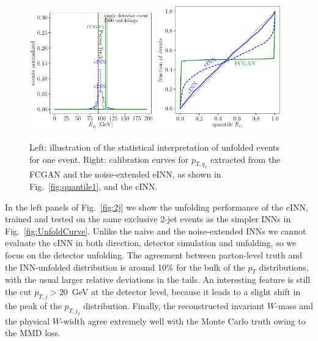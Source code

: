 \begin{figure}[t]
\includegraphics[page=9, width=0.48\textwidth]{figures/cINN/point1_cinn_inn_fcgan}
\includegraphics[page=20, width=0.48\textwidth]{figures/cINN/CalibrationCurvesCINNINNFCGAN}
\caption{Left: illustration of the statistical interpretation of
  unfolded events for one event. Right: calibration curves for
  $p_{T,q_1}$ extracted from the FCGAN and the noise-extended eINN, as
  shown in Fig.~\ref{fig:quantile1}, and the cINN.}
\label{fig:quantile2}
\end{figure}

In the left panels of Fig.~\ref{fig:2j} we show the unfolding
performance of the cINN, trained and tested on the same exclusive
2-jet events as the simpler INNs in Fig.~\ref{fig:UnfoldCurve}.
Unlike the naive and the noise-extended INNs we cannot evaluate the
cINN in both direction, detector simulation and unfolding, so we focus
on the detector unfolding. The agreement between parton-level truth
and the INN-unfolded distribution is around 10\% for the bulk of the
$p_T$ distributions, with the usual larger relative deviations in the
tails. An interesting feature is still the cut $p_{T,j} > 20$~GeV at
the detector level, because it leads to a slight shift in the peak of
the $p_{T,j_2}$ distribution.  Finally, the reconstructed invariant
$W$-mass and the physical $W$-width agree extremely well with the Monte
Carlo truth owing to the MMD loss.\medskip

